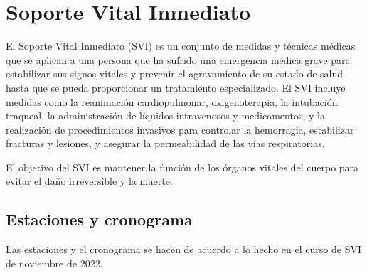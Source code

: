 \section{Soporte Vital Inmediato}
El Soporte Vital Inmediato (SVI) es un conjunto de medidas y técnicas médicas que se aplican a una persona que ha sufrido una emergencia médica grave para estabilizar sus signos vitales y prevenir el agravamiento de su estado de salud hasta que se pueda proporcionar un tratamiento especializado. El SVI incluye medidas como la reanimación cardiopulmonar, oxigenoterapia, la intubación traqueal, la administración de líquidos intravenosos y medicamentos, y la realización de procedimientos invasivos para controlar la hemorragia, estabilizar fracturas y lesiones, y asegurar la permeabilidad de las vías respiratorias.

El objetivo del SVI es mantener la función de los órganos vitales del cuerpo para evitar el daño irreversible y la muerte.

\subsection{Estaciones y cronograma}
Las estaciones y el cronograma se hacen de acuerdo a lo hecho en el curso de SVI de noviembre de 2022. 

